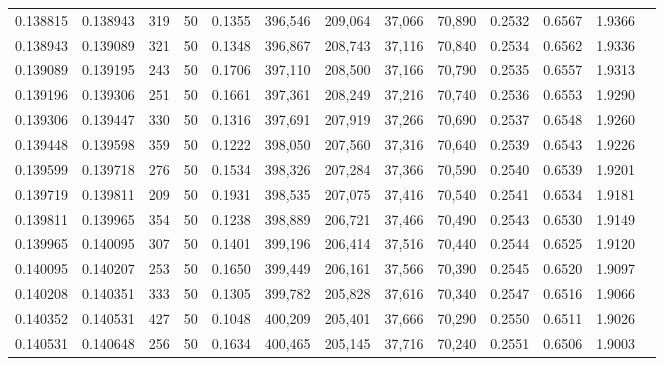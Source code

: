 \begin{tabular}{rrrrrrrrrrrrr}
0.138815 & 0.138943 &   319 &  50 &                                     0.1355 & 396,546 & 209,064 &  37,066 &  70,890 & 0.2532 & 0.6567 & 1.9366 \\
0.138943 & 0.139089 &   321 &  50 &                                     0.1348 & 396,867 & 208,743 &  37,116 &  70,840 & 0.2534 & 0.6562 & 1.9336 \\
0.139089 & 0.139195 &   243 &  50 &                                     0.1706 & 397,110 & 208,500 &  37,166 &  70,790 & 0.2535 & 0.6557 & 1.9313 \\
0.139196 & 0.139306 &   251 &  50 &                                     0.1661 & 397,361 & 208,249 &  37,216 &  70,740 & 0.2536 & 0.6553 & 1.9290 \\
0.139306 & 0.139447 &   330 &  50 &                                     0.1316 & 397,691 & 207,919 &  37,266 &  70,690 & 0.2537 & 0.6548 & 1.9260 \\
0.139448 & 0.139598 &   359 &  50 &                                     0.1222 & 398,050 & 207,560 &  37,316 &  70,640 & 0.2539 & 0.6543 & 1.9226 \\
0.139599 & 0.139718 &   276 &  50 &                                     0.1534 & 398,326 & 207,284 &  37,366 &  70,590 & 0.2540 & 0.6539 & 1.9201 \\
0.139719 & 0.139811 &   209 &  50 &                                     0.1931 & 398,535 & 207,075 &  37,416 &  70,540 & 0.2541 & 0.6534 & 1.9181 \\
0.139811 & 0.139965 &   354 &  50 &                                     0.1238 & 398,889 & 206,721 &  37,466 &  70,490 & 0.2543 & 0.6530 & 1.9149 \\
0.139965 & 0.140095 &   307 &  50 &                                     0.1401 & 399,196 & 206,414 &  37,516 &  70,440 & 0.2544 & 0.6525 & 1.9120 \\
0.140095 & 0.140207 &   253 &  50 &                                     0.1650 & 399,449 & 206,161 &  37,566 &  70,390 & 0.2545 & 0.6520 & 1.9097 \\
0.140208 & 0.140351 &   333 &  50 &                                     0.1305 & 399,782 & 205,828 &  37,616 &  70,340 & 0.2547 & 0.6516 & 1.9066 \\
0.140352 & 0.140531 &   427 &  50 &                                     0.1048 & 400,209 & 205,401 &  37,666 &  70,290 & 0.2550 & 0.6511 & 1.9026 \\
0.140531 & 0.140648 &   256 &  50 &                                     0.1634 & 400,465 & 205,145 &  37,716 &  70,240 & 0.2551 & 0.6506 & 1.9003 \\

\end{tabular}
